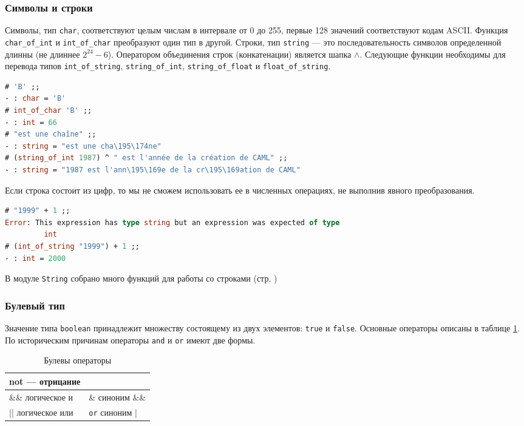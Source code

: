 \subsubsection{Символы и строки}

Символы, тип \texttt{char}, соответствуют целым числам в интервале от 0 до 255,
первые 128 значений соответствуют кодам ASCII. Функция \texttt{char\_of\_int} и
\texttt{int\_of\_char} преобразуют один тип в другой. Строки, тип
\texttt{string} --- это последовательность символов определенной длинны (не
длиннее $2^{24} - 6$). Оператором объединения строк (конкатенации) является
шапка $\wedge$. Следующие функции необходимы для перевода типов
\texttt{int\_of\_string}, \texttt{string\_of\_int}, \texttt{string\_of\_float} и
\texttt{float\_of\_string}.

\begin{lstlisting}[language=OCaml]
# 'B' ;;
- : char = 'B'
# int_of_char 'B' ;;
- : int = 66
# "est une chaîne" ;;
- : string = "est une cha\195\174ne"
# (string_of_int 1987) ^ " est l'année de la création de CAML" ;;
- : string = "1987 est l'ann\195\169e de la cr\195\169ation de CAML"
\end{lstlisting}

Если строка состоит из цифр, то мы не сможем использовать ее в численных
операциях, не выполнив явного преобразования.

\begin{lstlisting}[language=OCaml]
# "1999" + 1 ;;
Error: This expression has type string but an expression was expected of type
         int
# (int_of_string "1999") + 1 ;;
- : int = 2000
\end{lstlisting}

В модуле \texttt{String} собрано много функций для работы со строками (стр.
\pageref{??})

\subsubsection{Булевый тип}

Значение типа \texttt{boolean} принадлежит множеству состоящему из двух
элементов: \texttt{true} и \texttt{false}. Основные операторы описаны в таблице
\ref{tbl:boolean_operations}. По историческим причинам операторы \texttt{and} и
\texttt{or} имеют две формы.

\begin{table}[hl]
	\label{tbl:boolean_operations}
\begin{center}
	\caption{Булевы операторы}
	\begin{tabular}{|p{5cm}|p{5cm}|}
	\hline
	not --- отрицание & \\
	\hline
	\&\& логическое и & \& синоним \&\& \\
	\hline
	|| логическое или & \texttt{or} синоним | \\
	\hline
	\end{tabular}
\end{center}
\end{table}

